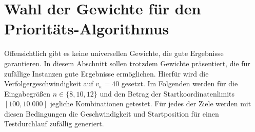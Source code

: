 \documentclass[german,version-2019-11]{uzl-thesis}
\begin{document}
\begin{table}[htpb]
\centering
{}
\caption{Beschneidungen im Suchbaum des Brute-Force-Algorithmus bei einer Eingabe von $1\leq n\leq 14$ Zielen}
\label{tab:ExpBF}
\end{table}
\newpage

\section{Wahl der Gewichte für den Prioritäts-Algorithmus}
\label{kap5:gewichte}

Offensichtlich gibt es keine universellen Gewichte, die gute Ergebnisse garantieren. In diesem Abschnitt sollen trotzdem Gewichte präsentiert, die für zufällige Instanzen gute Ergebnisse ermöglichen. Hierfür wird die Verfolgergeschwindigkeit auf $v_{\kappa}=40$ gesetzt. Im Folgenden  werden für die Eingabegrößen $n\in\{8,10,12\}$ und den Betrag der Startkoordinatenlimits $[100,10.000]$ jegliche Kombinationen getestet. Für jedes der Ziele werden mit diesen Bedingungen die Geschwindigkeit und Startposition für einen Testdurchlauf zufällig generiert.
\end{document}
